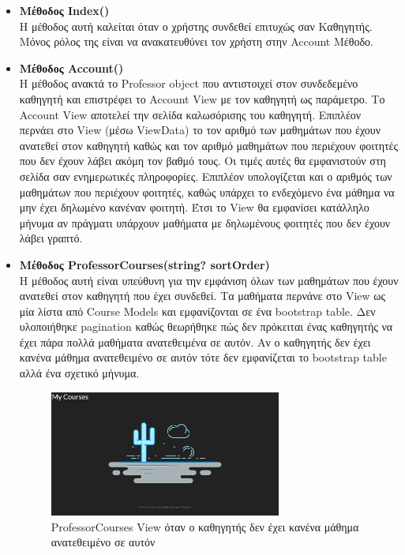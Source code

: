 \documentclass[12pt]{article}
\begin{document}
\begin{itemize}
	
	\item \textbf{Μέθοδος Index()}\\
	Η μέθοδος αυτή καλείται όταν ο χρήστης συνδεθεί επιτυχώς σαν Καθηγητής. Μόνος ρόλος της είναι να ανακατευθύνει τον χρήστη στην Account Μέθοδο.			
	
	\item \textbf{Μέθοδος Account()}\\
	Η μέθοδος ανακτά το Professor object που αντιστοιχεί στον συνδεδεμένο καθηγητή και επιστρέφει το Account View με τον καθηγητή ως παράμετρο. Το Account View αποτελεί την σελίδα καλωσόρισης του καθηγητή. Επιπλέον περνάει στο View (μέσω ViewData) το τον αριθμό των μαθημάτων που έχουν ανατεθεί στον καθηγητή καθώς και τον αριθμό μαθημάτων που περιέχουν φοιτητές που δεν έχουν λάβει ακόμη τον βαθμό τους. Οι τιμές αυτές θα εμφανιστούν στη σελίδα σαν ενημερωτικές πληροφορίες. Επιπλέον υπολογίζεται και ο αριθμός των μαθημάτων που περιέχουν φοιτητές, καθώς υπάρχει το ενδεχόμενο ένα μάθημα να μην έχει δηλωμένο κανέναν φοιτητή. Έτσι το View θα εμφανίσει κατάλληλο μήνυμα αν πράγματι υπάρχουν μαθήματα με δηλωμένους φοιτητές που δεν έχουν λάβει γραπτό.
	
	\item \textbf{Μέθοδος ProfessorCourses(string? sortOrder)}\\
 	Η μέθοδος αυτή είναι υπεύθυνη για την εμφάνιση όλων των μαθημάτων που έχουν ανατεθεί στον καθηγητή που έχει συνδεθεί. Τα μαθήματα περνάνε στο View ως μία λίστα από Course Models και εμφανίζονται σε ένα bootstrap table. Δεν υλοποιήθηκε pagination καθώς θεωρήθηκε πώς δεν πρόκειται ένας καθηγητής να έχει πάρα πολλά μαθήματα ανατεθειμένα σε αυτόν. Αν ο καθηγητής δεν έχει κανένα μάθημα ανατεθειμένο σε αυτόν τότε δεν εμφανίζεται το bootstrap table αλλά ένα σχετικό μήνυμα.
 	
 	 \begin{figure}[H]
 		\centering
 		\includegraphics[width=0.72\textwidth]{emptyView.png}
 		\caption{ProfessorCourses View όταν ο καθηγητής δεν έχει κανένα μάθημα ανατεθειμένο σε αυτόν}
 		\label{fig:emptyView}
 	\end{figure}
 	

\end{itemize}
\end{document}
